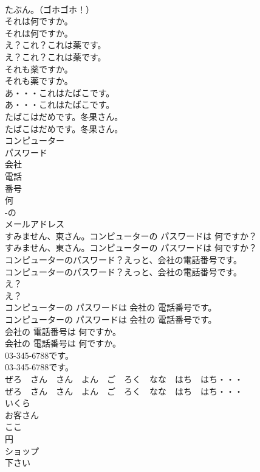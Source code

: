 \documentclass[8pt]{extreport}
\begin{document}
\begin{CJK}{UTF8}{min}
\\	たぶん。（ゴホゴホ！） 
\\	それは何ですか。	
\\	それは何ですか。 
\\	え？これ？これは薬です。	
\\	え？これ？これは薬です。 
\\	それも薬ですか。	
\\	それも薬ですか。 
\\	あ・・・これはたばこです。	
\\	あ・・・これはたばこです。 
\\	たばこはだめです。冬果さん。	
\\	たばこはだめです。冬果さん。 
\\	コンピューター
\\	パスワード
\\	会社
\\	電話
\\	番号
\\	何
\\	-の
\\	メールアドレス
\\	すみません、東さん。コンピューターの パスワードは 何ですか？	
\\	すみません、東さん。コンピューターの パスワードは 何ですか？ 
\\	コンピューターのパスワード？えっと、会社の電話番号です。	
\\	コンピューターのパスワード？えっと、会社の電話番号です。 
\\	え？	
\\	え？ 
\\	コンピューターの パスワードは 会社の 電話番号です。	
\\	コンピューターの パスワードは 会社の 電話番号です。 
\\	会社の 電話番号は 何ですか。	
\\	会社の 電話番号は 何ですか。 
\\	03-345-6788です。	
\\	03-345-6788です。 
\\	ぜろ　さん　さん　よん　ご　ろく　なな　はち　はち・・・	
\\	ぜろ　さん　さん　よん　ご　ろく　なな　はち　はち・・・ 
\\	いくら
\\	お客さん
\\	ここ
\\	円
\\	ショップ
\\	下さい

\end{CJK}
\end{document}

